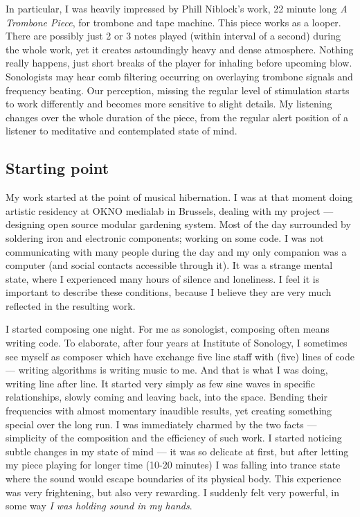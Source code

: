 \documentclass[12pt,a4paper,oneside]{report}
\begin{document}
In particular, I was heavily impressed by Phill Niblock's work, 22 minute long \emph{A Trombone Piece}, for trombone and tape machine. This piece works as a looper. There are possibly just 2 or 3 notes played (within interval of a second) during the whole work, yet it creates astoundingly heavy and dense atmosphere. Nothing really happens, just short breaks of the player for inhaling before upcoming blow. Sonologists may hear comb filtering occurring on overlaying trombone signals and frequency beating. Our perception, missing the regular level of stimulation starts to work differently and becomes more sensitive to slight details. My listening changes over the whole duration of the piece, from the regular alert position of a listener to meditative and contemplated state of mind. 

\subsection{Starting point} My work started at the point of musical hibernation. I was at that moment doing artistic residency at OKNO medialab in Brussels, dealing with my project --- designing open source modular gardening system. Most of the day surrounded by soldering iron and electronic components; working on some code. I was not communicating with many people during the day and my only companion was a computer (and social contacts accessible through it). It was a strange mental state, where I experienced many hours of silence and loneliness. I feel it is important to describe these conditions, because I believe they are very much reflected in the resulting work. 

I started composing one night. For me as sonologist, composing often means writing code. To elaborate, after four years at Institute of Sonology, I sometimes see myself as composer which have exchange five line staff with (five) lines of code --- writing algorithms is writing music to me. And that is what I was doing, writing line after line. It started very simply as few sine waves in specific relationships, slowly coming and leaving back, into the space. Bending their frequencies with almost momentary inaudible results, yet creating something special over the long run. I was immediately charmed by the two facts --- simplicity of the composition and the efficiency of such work. I started noticing subtle changes in my state of mind --- it was so delicate at first, but after letting my piece playing for longer time (10-20 minutes) I was falling into trance state where the sound would escape boundaries of its physical body. This experience was very frightening, but also very rewarding. I suddenly felt very powerful, in some way \emph{I was holding sound in my hands}. 
\end{document}
